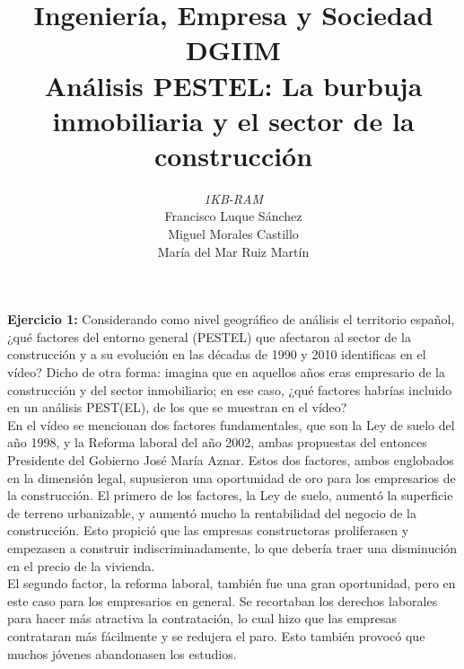 \documentclass[11pt]{article}
\theoremstyle{plain}
\theoremstyle{definition}
\begin{document}
\title{Ingeniería, Empresa y Sociedad \\
  DGIIM \\
  \large Análisis PESTEL: La burbuja inmobiliaria y el sector de la
  construcción}
\author{\textit{1KB-RAM}\\
  Francisco Luque Sánchez\\
  Miguel Morales Castillo\\
  María del Mar Ruiz Martín}

\maketitle

\textbf{Ejercicio 1:} Considerando como nivel geográfico de análisis
el territorio español, ¿qué factores del entorno general (PESTEL) que
afectaron al sector de la construcción y a su evolución en las décadas
de 1990 y 2010 identificas en el vídeo? Dicho de otra forma: imagina
que en aquellos años eras empresario de la construcción y del sector
inmobiliario; en ese caso, ¿qué factores habrías incluido en un
análisis PEST(EL), de los que se muestran en el vídeo?\\

En el vídeo se mencionan dos factores fundamentales, que son la Ley de
suelo del año 1998, y la Reforma laboral del año 2002, ambas
propuestas del entonces Presidente del Gobierno José María
Aznar. Estos dos factores, ambos englobados en la dimensión legal,
supusieron una oportunidad de oro para los empresarios de la
construcción. El primero de los factores, la Ley de suelo, aumentó la
superficie de terreno urbanizable, y aumentó mucho la rentabilidad del
negocio de la construcción. Esto propició que las empresas
constructoras proliferasen y empezasen a construir
indiscriminadamente, lo que debería
traer una disminución en el precio de la vivienda.\\

El segundo factor, la reforma laboral, también fue una gran
oportunidad, pero en este caso para los empresarios en general. Se
recortaban los derechos laborales para hacer más atractiva la
contratación, lo cual hizo que las empresas contrataran más fácilmente
y se redujera el paro. Esto también provocó que muchos jóvenes 
abandonasen los estudios. \\
\end{document}
